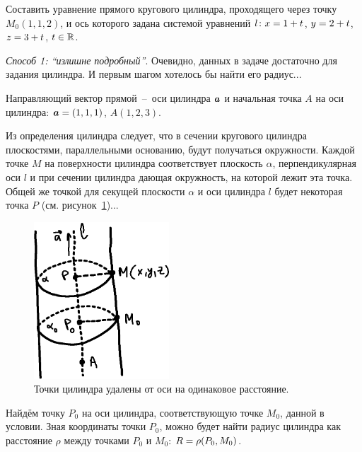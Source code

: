 \documentclass[a4paper,12pt]{article}
\begin{document}
  Составить уравнение прямого кругового цилиндра, проходящего через точку $M_0(1, 1, 2)$, и ось которого задана системой уравнений $l\colon x \hm= 1 \hm+ t$, $y \hm= 2 \hm+ t$, $z \hm= 3 \hm+ t$, $t \hm\in \RR$.
  
  \begin{solution}
    \vphantom{}
    
    \emph{Способ 1: ``излишне подробный''}.
    Очевидно, данных в задаче достаточно для задания цилиндра.
    И первым шагом хотелось бы найти его радиус...
    
    Направляющий вектор прямой~--~оси цилиндра $\boldsymbol a$ и начальная точка $A$ на оси цилиндра: $\bds a \hm= (1, 1, 1)$, $A(1, 2, 3)$.
    
    Из определения цилиндра следует, что в сечении кругового цилиндра плоскостями, параллельными основанию, будут получаться окружности.
    Каждой точке $M$ на поверхности цилиндра соответствует плоскость $\alpha$, перпендикулярная оси $l$ и при сечении цилиндра дающая окружность, на которой лежит эта точка.
    Общей же точкой для секущей плоскости $\alpha$ и оси цилиндра $l$ будет некоторая точка $P$ (см. рисунок~\ref{fig:cylinder-10-38})...
    
    \begin{figure}[h]
      \centering

      \includegraphics[width=0.45\textwidth]{cylinder-10-38}
    
      \caption{Точки цилиндра удалены от оси на одинаковое расстояние.}
      \label{fig:cylinder-10-38}
    \end{figure}
    
    Найдём точку $P_0$ на оси цилиндра, соответствующую точке $M_0$, данной в условии.
    Зная координаты точки $P_0$, можно будет найти радиус цилиндра как расстояние $\rho$ между точками $P_0$ и $M_0$: $R \hm= \rho(P_0, M_0)$.
    

\end{solution}
\end{document}
